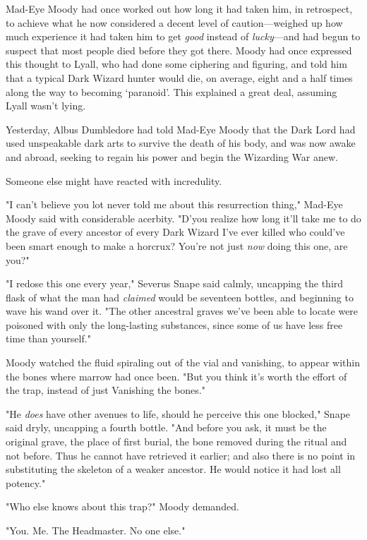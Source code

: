 Mad-Eye Moody had once worked out how long it had taken him, in retrospect, to
achieve what he now considered a decent level of caution—weighed up how much
experience it had taken him to get \emph{good} instead of \emph{lucky}—and
had begun to suspect that most people died before they got there. Moody had
once expressed this thought to Lyall, who had done some ciphering and figuring,
and told him that a typical Dark Wizard hunter would die, on average, eight and
a half times along the way to becoming `paranoid'. This explained a great deal,
assuming Lyall wasn't lying.

Yesterday, Albus Dumbledore had told Mad-Eye Moody that the Dark Lord had used
unspeakable dark arts to survive the death of his body, and was now awake and
abroad, seeking to regain his power and begin the Wizarding War anew.

Someone else might have reacted with incredulity.

"I can't believe you lot never told me about this resurrection thing," Mad-Eye
Moody said with considerable acerbity. "D'you realize how long it'll take me to
do the grave of every ancestor of every Dark Wizard I've ever killed who
could've been smart enough to make a horcrux? You're not just \emph{now} doing
this one, are you?"

"I redose this one every year," Severus Snape said calmly, uncapping the third
flask of what the man had \emph{claimed} would be seventeen bottles, and
beginning to wave his wand over it. "The other ancestral graves we've been able
to locate were poisoned with only the long-lasting substances, since some of us
have less free time than yourself."

Moody watched the fluid spiraling out of the vial and vanishing, to appear
within the bones where marrow had once been. "But you think it's worth the
effort of the trap, instead of just Vanishing the bones."

"He \emph{does} have other avenues to life, should he perceive this one
blocked," Snape said dryly, uncapping a fourth bottle. "And before you ask, it
must be the original grave, the place of first burial, the bone removed during
the ritual and not before. Thus he cannot have retrieved it earlier; and also
there is no point in substituting the skeleton of a weaker ancestor. He would
notice it had lost all potency."

"Who else knows about this trap?" Moody demanded.

"You. Me. The Headmaster. No one else."

